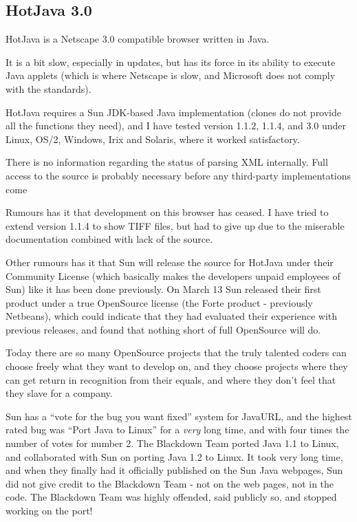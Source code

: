 \subsection{HotJava 3.0}
\label{sec:hotjava}

HotJava is a Netscape 3.0 compatible browser written in Java.

It is a bit slow, especially in updates, but has its force in its
ability to execute Java applets (which is where Netscape is slow, and
Microsoft does not comply with the standards).

HotJava requires a Sun JDK-based Java implementation (clones do not
provide all the functions they need), and I have tested version 1.1.2,
1.1.4, and 3.0 under Linux, OS/2, Windows, Irix and Solaris, where it
worked satisfactory.

\textsf{There is no information regarding the status of parsing XML
  internally.  Full access to the source is probably necessary before
  any third-party implementations come}


Rumours has it that development on this browser has ceased.  I have
tried to extend version 1.1.4 to show TIFF files, but had to give up
due to the miserable documentation combined with lack of the source.

Other rumours has it that Sun will release the source for HotJava
under their Community License (which basically makes the developers
unpaid employees of Sun) like it has been done previously.  On March
13 Sun released their first product under a true OpenSource license
(the Forte product - previously Netbeans), which could indicate that
they had evaluated their experience with previous releases, and found
that nothing short of full OpenSource will do.

Today there are so many OpenSource projects that the truly talented
coders can choose freely what they want to develop on, and they choose
projects where they can get return in recognition from their equals,
and where they don't feel that they slave for a company.

Sun has a ``vote for the bug you want fixed'' system for
Java\textsf{URL}, and the highest rated bug was ``Port Java to Linux''
for a \textit{very} long time, and with four times the number of votes
for number 2.  The Blackdown \textsf{Team} ported Java 1.1 to Linux,
and collaborated with Sun on porting Java 1.2 to Linux.  It took very
long time, and when they finally had it officially published on the
Sun Java webpages, Sun did not give credit to the Blackdown Team - not
on the web pages, not in the code.  The Blackdown Team was highly
offended, said publicly so, and stopped working on the port!

